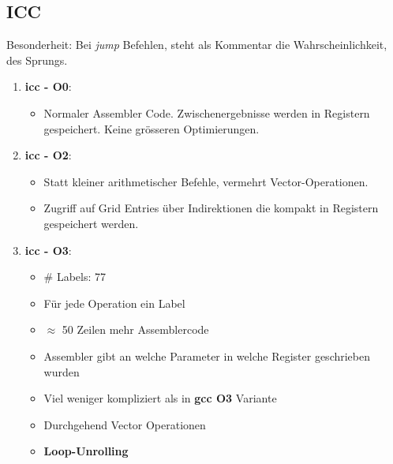 \documentclass{article}
\begin{document}
\subsection*{ICC}
Besonderheit: Bei \textit{jump} Befehlen, steht als Kommentar die Wahrscheinlichkeit,
des Sprungs.
\begin{enumerate}
	\item{ \textbf{icc - O0}:
			\begin{itemize}
				\item Normaler Assembler Code. Zwischenergebnisse werden in Registern
					gespeichert. Keine gr\"osseren Optimierungen.
			\end{itemize}
		}
	\item{ \textbf{icc - O2}:
			\begin{itemize}
				\item Statt kleiner arithmetischer Befehle, vermehrt Vector-Operationen.
				\item Zugriff auf Grid Entries \"uber Indirektionen die kompakt
					in Registern gespeichert werden.
			\end{itemize}
		}
	\item{ \textbf{icc - O3}:
			\begin{itemize}
				\item \# Labels: 77
				\item F\"ur jede Operation ein Label
				\item $\approx$ 50 Zeilen mehr Assemblercode
				\item Assembler gibt an welche Parameter in welche Register
					geschrieben wurden
				\item Viel weniger kompliziert als in \textbf{gcc O3} Variante
				\item Durchgehend Vector Operationen
				\item \textbf{Loop-Unrolling}
			\end{itemize}
		}
\end{enumerate}
\end{document}
